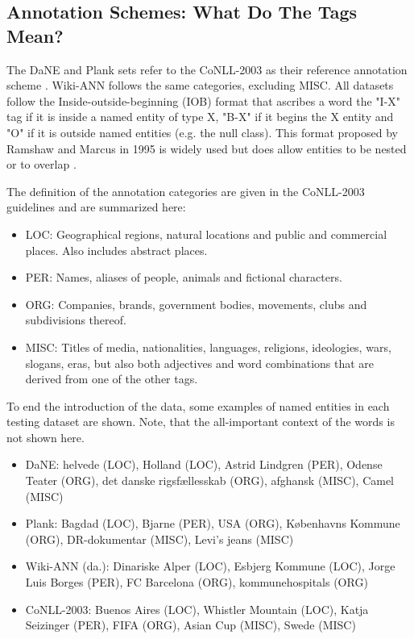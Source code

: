 \documentclass[main.tex]{subfiles}
\begin{document}
\subsection{Annotation Schemes: What Do The Tags Mean?}
\label{subsec:annoschemes}
The DaNE and Plank sets refer to the CoNLL-2003 as their reference annotation scheme \cite[Sec. 4]{hvingelby2020dane} \cite[Sec. 2.1]{plank2019neural}.
Wiki-ANN follows the same categories, excluding MISC.
All datasets follow the Inside-outside-beginning (IOB) format that ascribes a word the "I-X" tag if it is inside a named entity of type X, "B-X" if it begins the X entity and "O" if it is outside named entities (e.g. the null class).
This format proposed by Ramshaw and Marcus in 1995 is widely used but does allow entities to be nested or to overlap \cite{ramshaw1995IOB}.

The definition of the annotation categories are given in the CoNLL-2003 guidelines \footnotemark and are summarized here:
\begin{itemize}
    \item LOC: Geographical regions, natural locations and public and commercial places. Also includes abstract places.
    \item PER: Names, aliases of people, animals and fictional characters.
    \item ORG: Companies, brands, government bodies, movements, clubs and subdivisions thereof.
    \item MISC: Titles of media, nationalities, languages, religions, ideologies, wars, slogans, eras, but also both adjectives and word combinations that are derived from one of the other tags.
\end{itemize}
To end the introduction of the data, some examples of named entities in each testing dataset are shown.
Note, that the all-important context of the words is not shown here.
\begin{itemize}
    \item DaNE: helvede (LOC), Holland (LOC), Astrid Lindgren (PER), Odense Teater (ORG), det danske rigsfællesskab (ORG), afghansk (MISC), Camel (MISC)
    \item Plank: Bagdad (LOC), Bjarne (PER), USA (ORG), Københavns Kommune (ORG), DR-dokumentar (MISC), Levi's jeans (MISC)
    \item Wiki-ANN (da.): Dinariske Alper (LOC), Esbjerg Kommune (LOC), Jorge Luis Borges (PER), FC Barcelona (ORG), kommunehospitals (ORG)
    \item CoNLL-2003: Buenos Aires (LOC), Whistler Mountain (LOC), Katja Seizinger (PER),  FIFA (ORG), Asian Cup (MISC), Swede (MISC)
\end{itemize}
\end{document}
